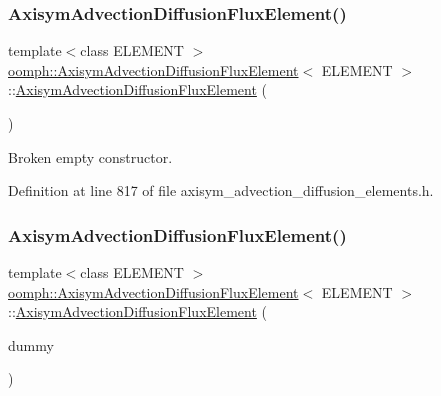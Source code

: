 \subsubsection{\texorpdfstring{Axisym\+Advection\+Diffusion\+Flux\+Element()}{AxisymAdvectionDiffusionFluxElement()}\hspace{0.1cm}{\footnotesize\ttfamily [2/3]}}
{\footnotesize\ttfamily template$<$class E\+L\+E\+M\+E\+NT $>$ \\
\hyperlink{classoomph_1_1AxisymAdvectionDiffusionFluxElement}{oomph\+::\+Axisym\+Advection\+Diffusion\+Flux\+Element}$<$ E\+L\+E\+M\+E\+NT $>$\+::\hyperlink{classoomph_1_1AxisymAdvectionDiffusionFluxElement}{Axisym\+Advection\+Diffusion\+Flux\+Element} (\begin{DoxyParamCaption}{ }\end{DoxyParamCaption})\hspace{0.3cm}{\ttfamily [inline]}}



Broken empty constructor. 



Definition at line 817 of file axisym\+\_\+advection\+\_\+diffusion\+\_\+elements.\+h.

\mbox{\label{classoomph_1_1AxisymAdvectionDiffusionFluxElement_ab37a5f165394c2a03a3d8d6de6fae148}} 
\subsubsection{\texorpdfstring{Axisym\+Advection\+Diffusion\+Flux\+Element()}{AxisymAdvectionDiffusionFluxElement()}\hspace{0.1cm}{\footnotesize\ttfamily [3/3]}}
{\footnotesize\ttfamily template$<$class E\+L\+E\+M\+E\+NT $>$ \\
\hyperlink{classoomph_1_1AxisymAdvectionDiffusionFluxElement}{oomph\+::\+Axisym\+Advection\+Diffusion\+Flux\+Element}$<$ E\+L\+E\+M\+E\+NT $>$\+::\hyperlink{classoomph_1_1AxisymAdvectionDiffusionFluxElement}{Axisym\+Advection\+Diffusion\+Flux\+Element} (\begin{DoxyParamCaption}\item[{const \hyperlink{classoomph_1_1AxisymAdvectionDiffusionFluxElement}{Axisym\+Advection\+Diffusion\+Flux\+Element}$<$ E\+L\+E\+M\+E\+NT $>$ \&}]{dummy }\end{DoxyParamCaption})\hspace{0.3cm}{\ttfamily [inline]}}



